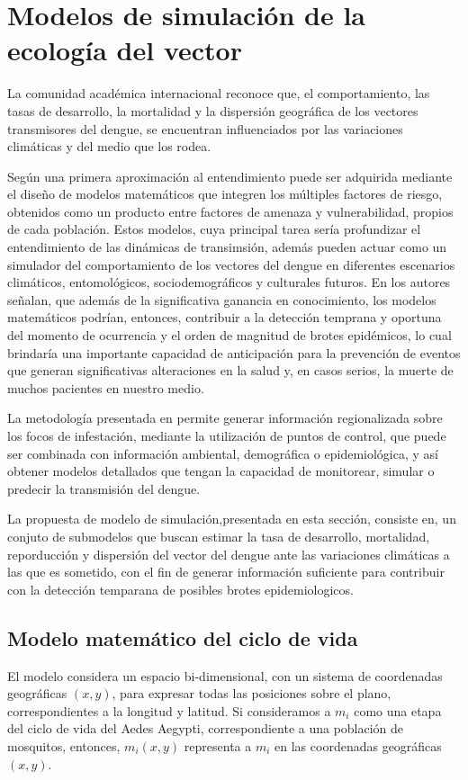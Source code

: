 \section{Modelos de simulación de la ecología del vector}
\label{sec:cap4-modelo-simulacion}

La comunidad académica internacional reconoce que, el comportamiento, las tasas de desarrollo, la
mortalidad y la dispersión geográfica de los vectores transmisores del dengue, se encuentran
influenciados por las variaciones climáticas y del medio que los rodea.

Según \citet{velez2013hacia} una primera aproximación al entendimiento puede ser adquirida
mediante el diseño de modelos matemáticos que integren los múltiples factores de riesgo, obtenidos
como un producto entre factores de amenaza y vulnerabilidad, propios de cada población. Estos
modelos, cuya principal tarea sería profundizar el entendimiento de las dinámicas de transimsión,
además pueden actuar como un simulador del comportamiento de los vectores del dengue en diferentes
escenarios climáticos, entomológicos, sociodemográficos y culturales futuros. En
\citet{velez2013hacia} los autores señalan, que además de la significativa ganancia en
conocimiento, los modelos matemáticos podrían, entonces, contribuir a la detección temprana y
oportuna del momento de ocurrencia y el orden de magnitud de brotes epidémicos, lo cual brindaría
una importante capacidad de anticipación para la prevención de eventos que generan significativas
alteraciones en la salud y, en casos serios, la muerte de muchos pacientes en nuestro medio.

La metodología presentada en \citet{NINO2011} permite generar información regionalizada sobre los
focos de infestación, mediante la utilización de puntos de control, que puede ser combinada con
información ambiental, demográfica o epidemiológica, y así obtener modelos detallados que tengan
la capacidad de monitorear, simular o predecir la transmisión del dengue.

La propuesta de modelo de simulación,presentada en esta sección, consiste en, un conjuto de
submodelos que buscan estimar la tasa de desarrollo, mortalidad, reporducción y dispersión del
vector del dengue ante las variaciones climáticas a las que es sometido, con el fin de generar
información suficiente para contribuir con la detección temparana de posibles brotes
epidemiologicos.

\subsection{Modelo matemático del ciclo de vida}
\label{subsec:cap4-modelo-matematico-ciclo-vida}
El modelo considera un espacio bi-dimensional, con un sistema de coordenadas geográficas $(x,y)$,
para expresar todas las posiciones sobre el plano, correspondientes a la longitud y latitud. Si
consideramos a $m_{i}$ como una etapa del ciclo de vida del Aedes Aegypti, correspondiente a una
población de mosquitos, entonces, $m_{i}(x,y)$ representa a $m_{i}$ en las coordenadas geográficas
$(x,y)$.

